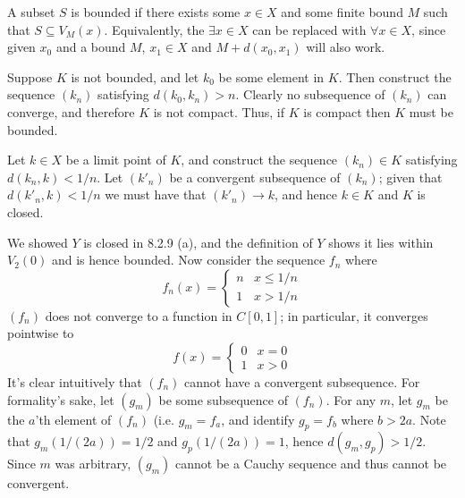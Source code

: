 \begin{exercise}
\end{exercise}
\begin{solution}
\item A subset \(S\) is bounded if there exists some \(x \in X\) and some finite bound \(M\) such that \(S \subseteq V_M(x)\). Equivalently, the \(\exists x \in X\) can be replaced with \(\forall x \in X\), since given \(x_0\) and a bound \(M\), \(x_1 \in X\) and \(M + d(x_0, x_1)\) will also work.
\item Suppose \(K\) is not bounded, and let \(k_0\) be some element in \(K\). Then construct the sequence \((k_n)\) satisfying \(d(k_0,k_n) > n\). Clearly no subsequence of \((k_n)\) can converge, and therefore \(K\) is not compact. Thus, if \(K\) is compact then \(K\) must be bounded.

Let \(k \in X\) be a limit point of \(K\), and construct the sequence \((k_n) \in K\) satisfying \(d(k_n, k) < 1/n\). Let \((k'_n)\) be a convergent subsequence of \((k_n)\); given that \(d(k'_n, k) < 1/n\) we must have that \((k'_n) \to k\), and hence \(k \in K\) and \(K\) is closed.

\item We showed \(Y\) is closed in 8.2.9 (a), and the definition of \(Y\) shows it lies within \(V_{2}(0)\) and is hence bounded. Now consider the sequence \(f_n\) where
\[f_n(x) = \begin{cases}
    n & x \leq 1/n \\
    1 & x > 1/n
\end{cases}\]
\((f_n)\) does not converge to a function in \(C[0,1]\); in particular, it converges pointwise to
\[f(x) = \begin{cases}
    0 & x = 0 \\
    1 & x > 0
\end{cases}\]
It's clear intuitively that \((f_n)\) cannot have a convergent subsequence. For formality's sake, let \((g_m)\) be some subsequence of \((f_n)\). For any \(m\), let \(g_m\) be the \(a\)'th element of \((f_n)\) (i.e. \(g_m = f_a\), and identify \(g_p = f_b\) where \(b > 2a\). Note that \(g_m(1/(2a)) = 1/2\) and \(g_p(1/(2a)) = 1\), hence \(d(g_m, g_p) > 1/2\). Since \(m\) was arbitrary, \((g_m)\) cannot be a Cauchy sequence and thus cannot be convergent.
\end{solution}

